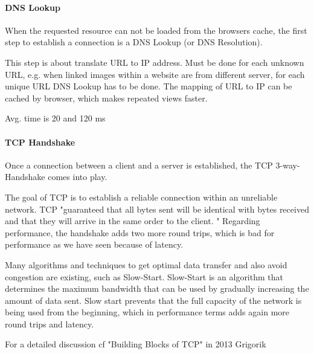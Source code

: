 

\paragraph{DNS Lookup}

When the requested resource can not be loaded from the browsers cache, the first step to establish a connection is a DNS Lookup (or DNS Resolution).

This step is about translate URL to IP address.
Must be done for each unknown URL, e.g. when linked images within a website are from different server, for each unique URL DNS Lookup has to be done.
The mapping of URL to IP can be cached by browser, which makes repeated views faster. %

Avg. time is 20 and 120 ms %





\paragraph{TCP Handshake}

Once a connection between a client and a server is established, the TCP 3-way-Handshake comes into play.

The goal of TCP is to establish a reliable connection within an unreliable network.
TCP  "guaranteed that all bytes sent will be identical with bytes received and that they will arrive in the same order to the client. " %
Regarding performance, the handshake adds two more round trips, which is bad for performance as we have seen because of latency.

Many algorithms and techniques to get optimal data transfer and also avoid congestion are existing, such as Slow-Start.
Slow-Start is an algorithm that determines the maximum bandwidth that can be used by gradually increasing the amount of data sent.
Slow start prevents that the full capacity of the network is being used from the beginning, which in performance terms adds again more round trips and latency. %

For a detailed discussion cf "Building Blocks of TCP" in 2013 Grigorik %

